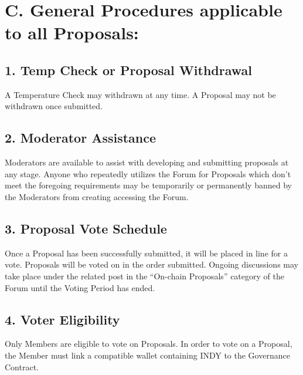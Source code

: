 \hypertarget{c.-general-procedures-applicable-to-all-proposals}{%
\section{C. General Procedures applicable to all
Proposals:}\label{c.-general-procedures-applicable-to-all-proposals}}

\hypertarget{temp-check-or-proposal-withdrawal}{%
\subsection{1. Temp Check or Proposal
Withdrawal}\label{temp-check-or-proposal-withdrawal}}

A Temperature Check may withdrawn at any time. A Proposal may not be
withdrawn once submitted.

\hypertarget{moderator-assistance}{%
\subsection{2. Moderator Assistance}\label{moderator-assistance}}

Moderators are available to assist with developing and submitting
proposals at any stage. Anyone who repeatedly utilizes the Forum for
Proposals which don't meet the foregoing requirements may be temporarily
or permanently banned by the Moderators from creating accessing the
Forum.

\hypertarget{proposal-vote-schedule}{%
\subsection{3. Proposal Vote Schedule}\label{proposal-vote-schedule}}

Once a Proposal has been successfully submitted, it will be placed in
line for a vote. Proposals will be voted on in the order submitted.
Ongoing discussions may take place under the related post in the
``On-chain Proposals'' category of the Forum until the Voting Period has
ended.

\hypertarget{voter-eligibility}{%
\subsection{4. Voter Eligibility}\label{voter-eligibility}}

Only Members are eligible to vote on Proposals. In order to vote on a
Proposal, the Member must link a compatible wallet containing INDY to
the Governance Contract.

